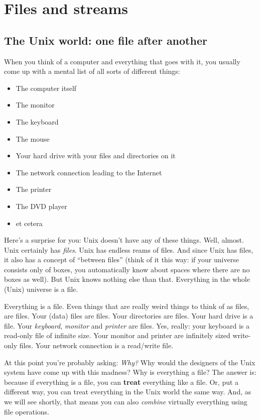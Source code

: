 \section{Files and streams}
\subsection{The Unix world: one file after another}
When you think of a computer and everything that goes with it, you usually come
up with a mental list of all sorts of different things:

\begin{itemize}
	\item The computer itself
	\item The monitor
	\item The keyboard
	\item The mouse
	\item Your hard drive with your files and directories on it
	\item The network connection leading to the Internet
	\item The printer
	\item The DVD player
	\item et cetera
\end{itemize}

Here's a surprise for you: Unix doesn't have any of these things. Well, almost.
Unix certainly has \emph{files}. Unix has endless reams of files. And since
Unix has files, it also has a concept of ``between files'' (think of it this
way: if your universe consists only of boxes, you automatically know about
spaces where there are no boxes as well). But Unix knows nothing else than
that. Everything in the whole (Unix) universe is a file.

Everything is a file. Even things that are really weird things to think of as
files, are files. Your (data) files are files. Your directories are files. Your
hard drive is a file. Your \emph{keyboard}, \emph{monitor} and \emph{printer}
are files. Yes, really: your keyboard is a read-only file of infinite size.
Your monitor and printer are infinitely sized write-only files. Your network
connection is a read/write file.

At this point you're probably asking: \emph{Why?} Why would the designers of
the Unix system have come up with this madness? Why is everything a file? The
answer is: because if everything is a file, you can \textbf{treat} everything
like a file. Or, put a different way, you can treat everything in the Unix
world the same way. And, as we will see shortly, that means you can also
\emph{combine} virtually everything using file operations.

